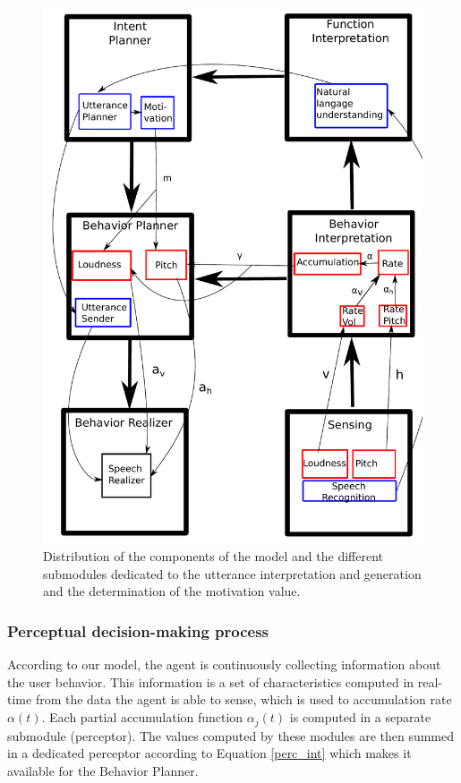 \begin{figure}
  \centering
  \includegraphics[width=\linewidth]{figure/impl_equ_dial.pdf}
  \caption{Distribution of the components of the model and the different submodules dedicated to the utterance interpretation and generation and the determination of the motivation value.}
  \label{impl_modules}
\end{figure}

\subsubsection{Perceptual decision-making process}

According to our model, the agent is continuously collecting information about the user behavior. This information is a set of characteristics computed in real-time from the data the agent is able to sense, which is used to accumulation rate $\alpha(t)$. 
Each partial accumulation function $\alpha_j(t)$ is computed in a separate submodule (perceptor). The values computed by these modules are then summed in a dedicated perceptor according to Equation \ref{perc_int} which makes it available for the Behavior Planner. 

